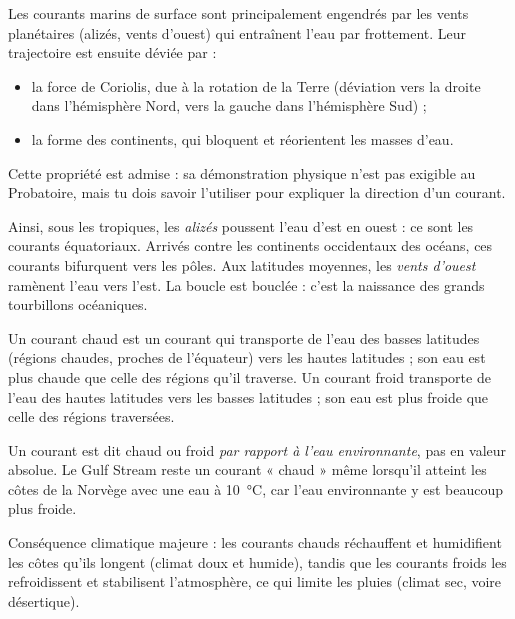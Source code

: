 \documentclass[11pt]{article}
\newcommand{\cle}[1]{{\popxbold\color{popdark}#1}}
\newcounter{popsec}
\newcounter{popsub}
\newcommand{\courssub}[1]{%
  \stepcounter{popsub}%
  \par\vspace{9pt}\noindent{\popxbold\fontsize{11.5}{13}\selectfont\color{popink}{\color{poporange}\thepopsec.\thepopsub}\hspace{6pt}#1}\par\nopagebreak\vspace{4pt}
}
\begin{document}
\begin{propriete}
Les courants marins de surface sont principalement engendrés par les \cle{vents planétaires} (alizés, vents d'ouest) qui entraînent l'eau par frottement. Leur trajectoire est ensuite déviée par :
\begin{itemize}
\item la \cle{force de Coriolis}, due à la rotation de la Terre (déviation vers la droite dans l'hémisphère Nord, vers la gauche dans l'hémisphère Sud) ;
\item la \cle{forme des continents}, qui bloquent et réorientent les masses d'eau.
\end{itemize}
Cette propriété est admise : sa démonstration physique n'est pas exigible au Probatoire, mais tu dois savoir l'utiliser pour expliquer la direction d'un courant.
\end{propriete}

Ainsi, sous les tropiques, les \emph{alizés} poussent l'eau d'est en ouest : ce sont les courants équatoriaux. Arrivés contre les continents occidentaux des océans, ces courants bifurquent vers les pôles. Aux latitudes moyennes, les \emph{vents d'ouest} ramènent l'eau vers l'est. La boucle est bouclée : c'est la naissance des grands tourbillons océaniques.

\courssub{Courants chauds et courants froids}

\begin{definition}
Un \cle{courant chaud} est un courant qui transporte de l'eau des basses latitudes (régions chaudes, proches de l'équateur) vers les hautes latitudes ; son eau est plus chaude que celle des régions qu'il traverse. Un \cle{courant froid} transporte de l'eau des hautes latitudes vers les basses latitudes ; son eau est plus froide que celle des régions traversées.
\end{definition}

\begin{attention}
Un courant est dit chaud ou froid \emph{par rapport à l'eau environnante}, pas en valeur absolue. Le Gulf Stream reste un courant « chaud » même lorsqu'il atteint les côtes de la Norvège avec une eau à \SI{10}{\celsius}, car l'eau environnante y est beaucoup plus froide.
\end{attention}

Conséquence climatique majeure : les courants chauds réchauffent et humidifient les côtes qu'ils longent (climat doux et humide), tandis que les courants froids les refroidissent et stabilisent l'atmosphère, ce qui limite les pluies (climat sec, voire désertique).
\end{document}
